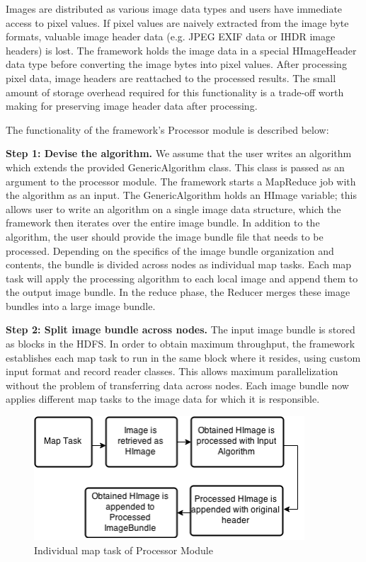 \documentclass{osuthesis}
\begin{document}
				Images are distributed as various image data types and users have
				immediate access to pixel values.  If pixel values are naively
				extracted from the image byte formats, valuable image header data
				(e.g. JPEG EXIF data or IHDR \cite{David03} image headers) is
				lost. The framework holds the image data in a special HImageHeader
				data type before converting the image bytes into pixel values.  After
				processing pixel data, image headers are reattached to the processed
				results.  The small amount of storage overhead required for this
				functionality is a trade-off worth making for preserving
				image header data after processing.
				
				The functionality of the framework's Processor module is described
				below:
				
				\textbf{Step 1: Devise the algorithm.} We assume that the user writes
				an algorithm which extends the provided GenericAlgorithm class. This
				class is passed as an argument to the processor module. The framework
				starts a MapReduce job with the algorithm as an input. The
				GenericAlgorithm holds an HImage variable; this allows user to write
				an algorithm on a single image data structure, which the framework
				then iterates over the entire image bundle. In addition to the
				algorithm, the user should provide the image bundle file that needs to
				be processed.  Depending on the specifics of the image bundle
				organization and contents, the bundle is divided across nodes as
				individual map tasks. Each map task will apply the processing
				algorithm to each local image and append them to the output
				image bundle. In the reduce phase, the Reducer merges these image
				bundles into a large image bundle.
				
				\textbf{Step 2: Split image bundle across nodes.} The input image
				bundle is stored as blocks in the HDFS.  In order to obtain maximum
				throughput, the framework establishes each map task to run in the same
				block where it resides, using custom input format and record reader
				classes. This allows maximum parallelization without the problem of
				transferring data across nodes.  Each image bundle now applies
				different map tasks to the image data for which it is responsible.
				
				\begin{figure}[h]
					\centering
					\includegraphics[width=0.90\textwidth]{pro-map}
					\caption{Individual map task of Processor Module}
					\label{fig:pro-map}
				\end{figure}
				
\end{document}
